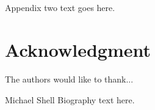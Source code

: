 \documentclass[peerreview]{IEEEtran}
\begin{document}
\section{}
Appendix two text goes here.


\section*{Acknowledgment}


The authors would like to thank...


\ifCLASSOPTIONcaptionsoff
  \newpage
\fi

\cite{IEEEexample:IEEEwebsite}





%


% 

\begin{IEEEbiography}{Michael Shell}
Biography text here.
\end{IEEEbiography}
\end{document}

